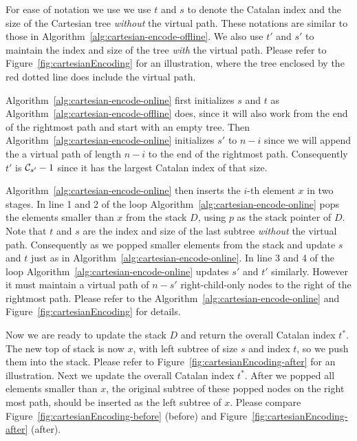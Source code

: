 For ease of notation we use we use $t$ and $s$ to denote the Catalan
index and the size of the Cartesian tree {\em without} the virtual path.
These notations are similar to those in
Algorithm~\ref{alg:cartesian-encode-offline}.  We also use $t'$ and $s'$
to maintain the index and size of the tree {\em with} the virtual path.
Please refer to Figure~\ref{fig:cartesianEncoding} for an illustration,
where the tree enclosed by the red dotted line does include the virtual
path.

Algorithm~\ref{alg:cartesian-encode-online} first initializes $s$ and
$t$ as Algorithm~\ref{alg:cartesian-encode-offline} does, since it
will also work from the end of the rightmost path and start with an
empty tree.  Then Algorithm~\ref{alg:cartesian-encode-online}
initializes $s'$ to $n - i$ since we will append the a virtual path of
length $n - i$ to the end of the rightmost path.  Consequently $t'$ is
${\cal C}_{s'} - 1$ since it has the largest Catalan index of that
size.

Algorithm~\ref{alg:cartesian-encode-online} then inserts the $i$-th
element $x$ in two stages.  In line 1 and 2 of the loop
Algorithm~\ref{alg:cartesian-encode-online} pops the elements smaller
than $x$ from the stack $D$, using $p$ as the stack pointer of $D$. Note
that $t$ and $s$ are the index and size of the last subtree {\em
without} the virtual path.  Consequently as we popped smaller elements
from the stack and update $s$ and $t$ just as in
Algorithm~\ref{alg:cartesian-encode-online}.  In line 3 and 4 of the
loop Algorithm~\ref{alg:cartesian-encode-online} updates $s'$ and $t'$
similarly.  However it must maintain a virtual path of $n - s'$
right-child-only nodes to the right of the rightmost path.  Please
refer to the Algorithm~\ref{alg:cartesian-encode-online} and
Figure~\ref{fig:cartesianEncoding} for details.



Now we are ready to update the stack $D$ and return the overall Catalan
index $t^*$.  The new top of stack is now $x$, with left subtree of size
$s$ and index $t$, so we push them into the stack. Please refer to
Figure~\ref{fig:cartesianEncoding-after} for an illustration.  Next we
update the overall Catalan index $t^*$.  After we popped all elements
smaller than $x$, the original subtree of these popped nodes on the
right most path, should be inserted as the left subtree of $x$.  Please
compare Figure~\ref{fig:cartesianEncoding-before} (before) and
Figure~\ref{fig:cartesianEncoding-after} (after).

